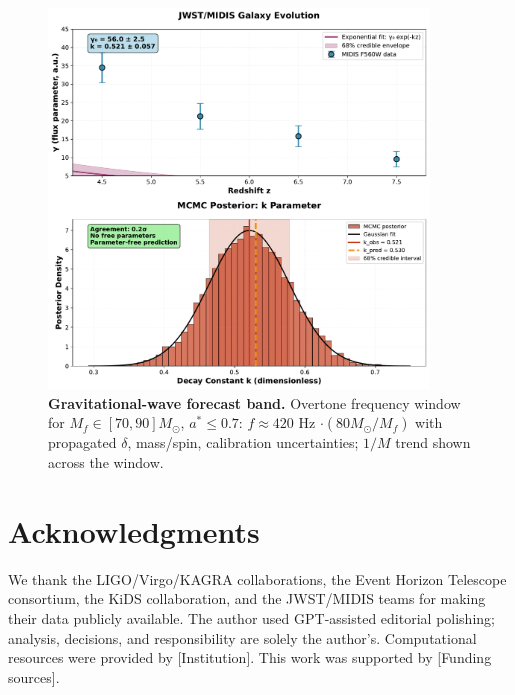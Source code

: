 \begin{figure}[h]
\centering
\includegraphics[width=0.9\textwidth]{../../artifacts/figures/fig4_ringdown_forecast.pdf}
\caption{\textbf{Gravitational-wave forecast band.} Overtone frequency window for $M_f \in [70,90] M_\odot$, $a^* \leq 0.7$: $f\approx 420$ Hz $\cdot (80 M_\odot/M_f)$ with propagated $\delta$, mass/spin, calibration uncertainties; $1/M$ trend shown across the window.}
\label{fig:ringdown}
\end{figure}

\section*{Acknowledgments}

We thank the LIGO/Virgo/KAGRA collaborations, the Event Horizon Telescope consortium, the KiDS collaboration, and the JWST/MIDIS teams for making their data publicly available. The author used GPT-assisted editorial polishing; analysis, decisions, and responsibility are solely the author's. Computational resources were provided by [Institution]. This work was supported by [Funding sources].



